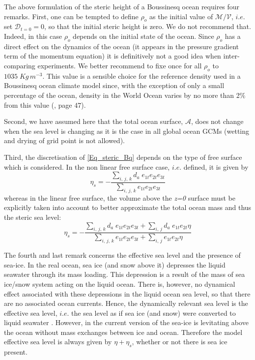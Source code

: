 \documentclass[NEMO_book]{subfiles}
\begin{document}
The above formulation of the steric height of a Boussinesq ocean requires four remarks.
First, one can be tempted to define $\rho_o$ as the initial value of $\mathcal{M}/\mathcal{V}$,
$i.e.$ set $\mathcal{D}_{t=0}=0$, so that the initial steric height is zero. We do not
recommend that. Indeed, in this case $\rho_o$ depends on the initial state of the ocean. 
Since $\rho_o$ has a direct effect on the dynamics of the ocean (it appears in the pressure 
gradient term of the momentum equation) it is definitively not a good idea when 
inter-comparing experiments. 
We better recommend to fixe once for all $\rho_o$ to $1035\;Kg\,m^{-3}$. This value is a 
sensible choice for the reference density used in a Boussinesq ocean climate model since, 
with the exception of only a small percentage of the ocean, density in the World Ocean 
varies by no more than 2$\%$ from this value (\cite{Gill1982}, page 47).

Second, we have assumed here that the total ocean surface, $\mathcal{A}$, does not
change when the sea level is changing as it is the case in all global ocean GCMs 
(wetting and drying of grid point is not allowed). 
  
Third, the discretisation of \eqref{Eq_steric_Bq} depends on the type of free surface
which is considered. In the non linear free surface case, $i.e.$  defined, it is
given by
\begin{equation}  \label{Eq_discrete_steric_Bq}
   \eta_s =  - \frac{ \sum_{i,\,j,\,k} d_a\; e_{1t} e_{2t} e_{3t} }
   					{ \sum_{i,\,j,\,k}         e_{1t} e_{2t} e_{3t} } 
\end{equation}
whereas in the linear free surface, the volume above the \textit{z=0} surface must be explicitly taken 
into account to better approximate the total ocean mass and thus the steric sea level:
\begin{equation}  \label{Eq_discrete_steric_Bq}
   \eta_s =  - \frac{ \sum_{i,\,j,\,k} d_a\; e_{1t}e_{2t}e_{3t} + \sum_{i,\,j} d_a\; e_{1t}e_{2t} \eta }
   						{\sum_{i,\,j,\,k} e_{1t}e_{2t}e_{3t} + \sum_{i,\,j}           e_{1t}e_{2t} \eta } 
\end{equation}

The fourth and last remark concerns the effective sea level and the presence of sea-ice.
In the real ocean, sea ice (and snow above it)  depresses the liquid seawater through 
its mass loading. This depression is a result of the mass of sea ice/snow system acting 
on the liquid ocean. There is, however, no dynamical effect associated with these depressions 
in the liquid ocean sea level, so that there are no associated ocean currents. Hence, the 
dynamically relevant sea level is the effective sea level, $i.e.$ the sea level as if sea ice 
(and snow) were converted to liquid seawater \citep{Campin_al_OM08}. However,
in the current version of \NEMO the sea-ice is levitating above the ocean without 
mass exchanges between ice and ocean. Therefore the model effective sea level
is always given by $\eta + \eta_s$, whether or not there is sea ice present.
\end{document}
